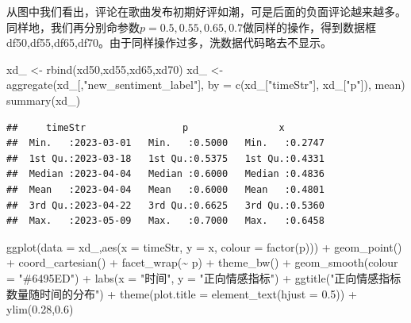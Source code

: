 \documentclass[
]{article}
\newenvironment{Shaded}{\begin{snugshade}}{\end{snugshade}}
\newcommand{\AttributeTok}[1]{\textcolor[rgb]{0.77,0.63,0.00}{#1}}
\newcommand{\FloatTok}[1]{\textcolor[rgb]{0.00,0.00,0.81}{#1}}
\newcommand{\FunctionTok}[1]{\textcolor[rgb]{0.00,0.00,0.00}{#1}}
\newcommand{\NormalTok}[1]{#1}
\newcommand{\OtherTok}[1]{\textcolor[rgb]{0.56,0.35,0.01}{#1}}
\newcommand{\SpecialCharTok}[1]{\textcolor[rgb]{0.00,0.00,0.00}{#1}}
\newcommand{\StringTok}[1]{\textcolor[rgb]{0.31,0.60,0.02}{#1}}
\begin{document}
从图中我们看出，评论在歌曲发布初期好评如潮，可是后面的负面评论越来越多。同样地，我们再分别命参数\(p=0.5,0.55,0.65,0.7\)做同样的操作，得到数据框df50,df55,df65,df70。由于同样操作过多，洗数据代码略去不显示。

\begin{Shaded}
\begin{Highlighting}[]
\NormalTok{xd\_ }\OtherTok{\textless{}{-}} \FunctionTok{rbind}\NormalTok{(xd50,xd55,xd65,xd70)}
\NormalTok{xd\_ }\OtherTok{\textless{}{-}} \FunctionTok{aggregate}\NormalTok{(xd\_[,}\StringTok{"new\_sentiment\_label"}\NormalTok{], }\AttributeTok{by =} \FunctionTok{c}\NormalTok{(xd\_[}\StringTok{"timeStr"}\NormalTok{], xd\_[}\StringTok{"p"}\NormalTok{]), mean)}
\FunctionTok{summary}\NormalTok{(xd\_)}
\end{Highlighting}
\end{Shaded}

\begin{verbatim}
##     timeStr                 p                x         
##  Min.   :2023-03-01   Min.   :0.5000   Min.   :0.2747  
##  1st Qu.:2023-03-18   1st Qu.:0.5375   1st Qu.:0.4331  
##  Median :2023-04-04   Median :0.6000   Median :0.4836  
##  Mean   :2023-04-04   Mean   :0.6000   Mean   :0.4801  
##  3rd Qu.:2023-04-22   3rd Qu.:0.6625   3rd Qu.:0.5360  
##  Max.   :2023-05-09   Max.   :0.7000   Max.   :0.6458
\end{verbatim}

\begin{Shaded}
\begin{Highlighting}[]
\FunctionTok{ggplot}\NormalTok{(}\AttributeTok{data =}\NormalTok{ xd\_,}\FunctionTok{aes}\NormalTok{(}\AttributeTok{x =}\NormalTok{ timeStr, }\AttributeTok{y =}\NormalTok{ x, }\AttributeTok{colour =} \FunctionTok{factor}\NormalTok{(p))) }\SpecialCharTok{+} \FunctionTok{geom\_point}\NormalTok{() }\SpecialCharTok{+} \FunctionTok{coord\_cartesian}\NormalTok{() }\SpecialCharTok{+} \FunctionTok{facet\_wrap}\NormalTok{(}\SpecialCharTok{\textasciitilde{}}\NormalTok{ p) }\SpecialCharTok{+} \FunctionTok{theme\_bw}\NormalTok{() }\SpecialCharTok{+} \FunctionTok{geom\_smooth}\NormalTok{(}\AttributeTok{colour =} \StringTok{"\#6495ED"}\NormalTok{) }\SpecialCharTok{+} \FunctionTok{labs}\NormalTok{(}\AttributeTok{x =} \StringTok{"时间"}\NormalTok{, }\AttributeTok{y =} \StringTok{"正向情感指标"}\NormalTok{) }\SpecialCharTok{+} \FunctionTok{ggtitle}\NormalTok{(}\StringTok{"正向情感指标数量随时间的分布"}\NormalTok{) }\SpecialCharTok{+} \FunctionTok{theme}\NormalTok{(}\AttributeTok{plot.title =} \FunctionTok{element\_text}\NormalTok{(}\AttributeTok{hjust =} \FloatTok{0.5}\NormalTok{)) }\SpecialCharTok{+} \FunctionTok{ylim}\NormalTok{(}\FloatTok{0.28}\NormalTok{,}\FloatTok{0.6}\NormalTok{) }
\end{Highlighting}
\end{Shaded}
\end{document}

